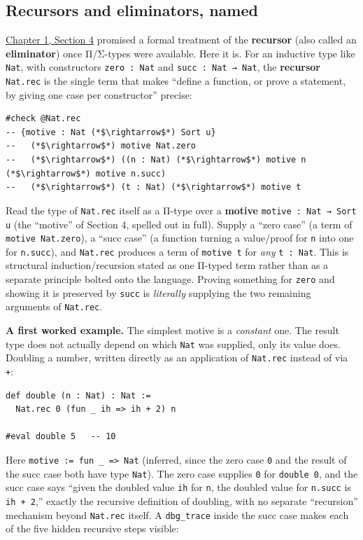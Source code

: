 \subsection{Recursors and eliminators, named}\label{sec:01-basics:05-pi-sigma-and-coc:6}

\hyperref[sec:01-basics:04-terminology:1]{Chapter 1, Section 4} promised a formal treatment of the \textbf{recursor} (also called an \textbf{eliminator}) once Π/Σ-types were available. Here it is. For an inductive type like \texttt{Nat}, with constructors \texttt{zero : Nat} and \texttt{succ : Nat → Nat}, the \textbf{recursor} \texttt{Nat.rec} is the single term that makes ``define a function, or prove a statement, by giving one case per constructor'' precise:

\begin{lstlisting}
#check @Nat.rec
-- {motive : Nat (*$\rightarrow$*) Sort u}
--   (*$\rightarrow$*) motive Nat.zero
--   (*$\rightarrow$*) ((n : Nat) (*$\rightarrow$*) motive n (*$\rightarrow$*) motive n.succ)
--   (*$\rightarrow$*) (t : Nat) (*$\rightarrow$*) motive t
\end{lstlisting}

Read the type of \texttt{Nat.rec} itself as a Π-type over a \textbf{motive} \texttt{motive : Nat → Sort u} (the ``motive'' of Section 4, spelled out in full). Supply a ``zero case'' (a term of \texttt{motive Nat.zero}), a ``succ case'' (a function turning a value/proof for \texttt{n} into one for \texttt{n.succ}), and \texttt{Nat.rec} produces a term of \texttt{motive t} for \emph{any} \texttt{t : Nat}. This is structural induction/recursion stated as one Π-typed term rather than as a separate principle bolted onto the language. Proving something for \texttt{zero} and showing it is preserved by \texttt{succ} is \emph{literally} supplying the two remaining arguments of \texttt{Nat.rec}.

\textbf{A first worked example.} The simplest motive is a \emph{constant} one. The result type does not actually depend on which \texttt{Nat} was supplied, only its value does. Doubling a number, written directly as an application of \texttt{Nat.rec} instead of via \texttt{+}:

\begin{lstlisting}
def double (n : Nat) : Nat :=
  Nat.rec 0 (fun _ ih => ih + 2) n

#eval double 5   -- 10
\end{lstlisting}

Here \texttt{motive := fun \_\allowbreak{} => Nat} (inferred, since the zero case \texttt{0} and the result of the succ case both have type \texttt{Nat}). The zero case supplies \texttt{0} for \texttt{double 0}, and the succ case says ``given the doubled value \texttt{ih} for \texttt{n}, the doubled value for \texttt{n.succ} is \texttt{ih + 2},'' exactly the recursive definition of doubling, with no separate ``recursion'' mechanism beyond \texttt{Nat.rec} itself. A \texttt{dbg\_\allowbreak{}trace} inside the succ case makes each of the five hidden recursive steps visible:

